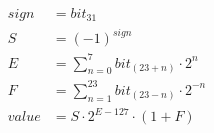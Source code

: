 \begin{equation*}
\begin{aligned}
    sign &= bit_{31} \\
    S &= (-1)^{sign}  \\
    E &= \sum_{n=0}^{7}{bit_{(23+n)} \cdot 2^n} \\
    F &= \sum_{n=1}^{23}{bit_{(23-n)} \cdot 2^{-n}} \\
    value &= S \cdot 2^{E-127} \cdot (1 + F) \\
\end{aligned}
\label{eq:float32_value}
\end{equation*}
